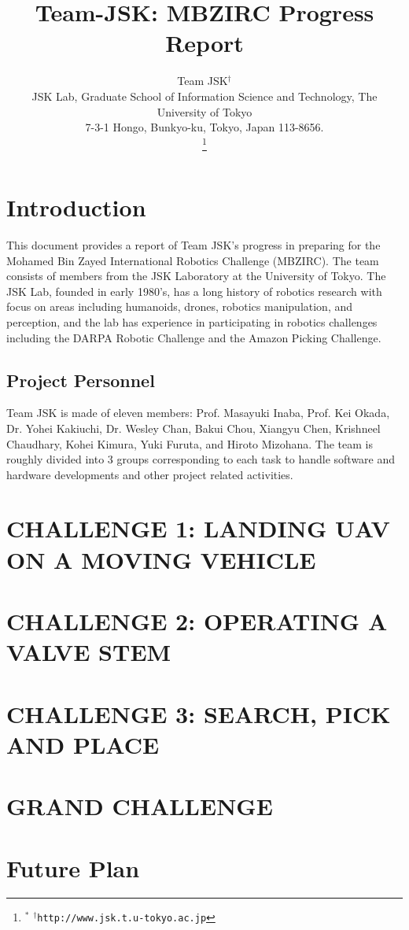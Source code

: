 \documentclass[letterpaper, 10 pt, conference]{ieeeconf}  %
\title{\LARGE \bf
  Team-JSK: MBZIRC Progress Report
}
\author{Team JSK$^\dagger$%
  \\ JSK Lab, Graduate School of Information Science and Technology, The University of Tokyo \\
  7-3-1 Hongo, Bunkyo-ku, Tokyo, Japan 113-8656.  \\
\thanks{$^{*}$ %
{$^\dagger$\tt\small http://www.jsk.t.u-tokyo.ac.jp}
}}
\begin{document}
\maketitle
\thispagestyle{empty}
\pagestyle{empty}


\section{Introduction}
This document provides a report of Team JSK's progress in preparing for the Mohamed Bin Zayed International Robotics Challenge (MBZIRC). The team consists of members from the JSK Laboratory at the University of Tokyo. The JSK Lab, founded in early 1980’s, has a long history of robotics research with focus on areas including humanoids, drones, robotics manipulation, and perception, and the lab has experience in participating in robotics challenges including the DARPA Robotic Challenge and the Amazon Picking Challenge.

\subsection{Project Personnel}
Team JSK is made of eleven members: Prof. Masayuki Inaba, Prof. Kei Okada, Dr. Yohei Kakiuchi, Dr. Wesley Chan, Bakui Chou, Xiangyu Chen, Krishneel Chaudhary, Kohei Kimura, Yuki Furuta, and Hiroto Mizohana. The team is roughly divided into 3 groups corresponding to each task to handle software and hardware developments and other project related activities.




\section{CHALLENGE 1: LANDING UAV ON A MOVING VEHICLE}




\section{CHALLENGE 2: OPERATING A VALVE STEM}


\section{CHALLENGE 3: SEARCH, PICK AND PLACE}




\section{GRAND CHALLENGE}


\section{Future Plan}
\end{document}
